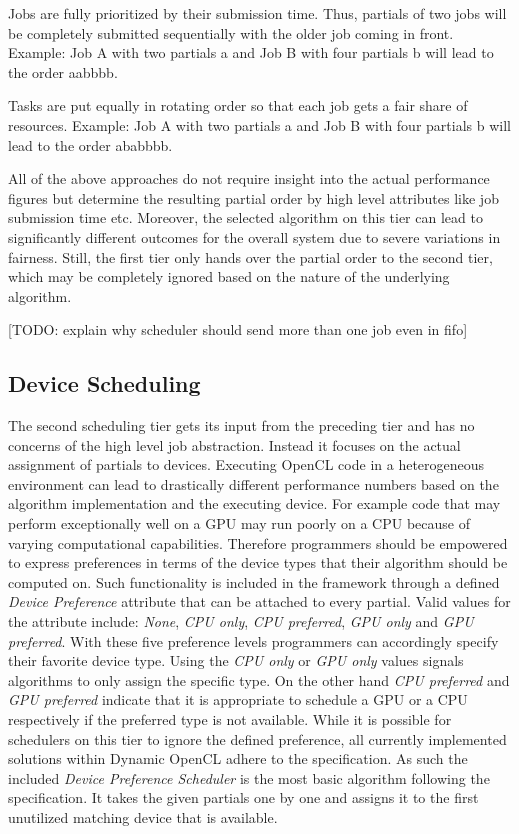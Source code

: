 \begin{description}[style=nextline]
	\item[First-In First-Out (abbrv. FIFO)] 
	Jobs are fully prioritized by their submission time. Thus, partials of two jobs will be completely submitted sequentially with the older job coming in front. Example: Job A with two partials a and Job B with four partials b will lead to the order aabbbb.
	\item[Round-Robin] 
	Tasks are put equally in rotating order so that each job gets a fair share of resources. Example: Job A with two partials a and Job B with four partials b will lead to the order ababbbb.
\end{description}

All of the above approaches do not require insight into the actual performance figures but determine the resulting partial order by high level attributes like job submission time etc. Moreover, the selected algorithm on this tier can lead to significantly different outcomes for the overall system due to severe variations in fairness. Still, the first tier only hands over the partial order to the second tier, which may be completely ignored based on the nature of the underlying algorithm.

[TODO: explain why scheduler should send more than one job even in fifo]

\subsection{Device Scheduling}
The second scheduling tier gets its input from the preceding tier and has no concerns of the high level job abstraction. Instead it focuses on the actual assignment of partials to devices. Executing OpenCL code in a heterogeneous environment can lead to drastically different performance numbers based on the algorithm implementation and the executing device. For example code that may perform exceptionally well on a GPU may run poorly on a CPU because of varying computational capabilities. Therefore programmers should be empowered to express preferences in terms of the device types that their algorithm should be computed on. Such functionality is included in the framework through a defined \textit{Device Preference} attribute that can be attached to every partial. Valid values for the attribute include: \textit{None}, \textit{CPU only}, \textit{CPU preferred}, \textit{GPU only} and \textit{GPU preferred}. With these five preference levels programmers can accordingly specify their favorite device type. Using the \textit{CPU only} or \textit{GPU only} values signals algorithms to only assign the specific type. On the other hand \textit{CPU preferred} and \textit{GPU preferred} indicate that it is appropriate to schedule a GPU or a CPU respectively if the preferred type is not available. While it is possible for schedulers on this tier to ignore the defined preference, all currently implemented solutions within Dynamic OpenCL adhere to the specification. As such the included \textit{Device Preference Scheduler} is the most basic algorithm following the specification. It takes the given partials one by one and assigns it to the first unutilized matching device that is available.

